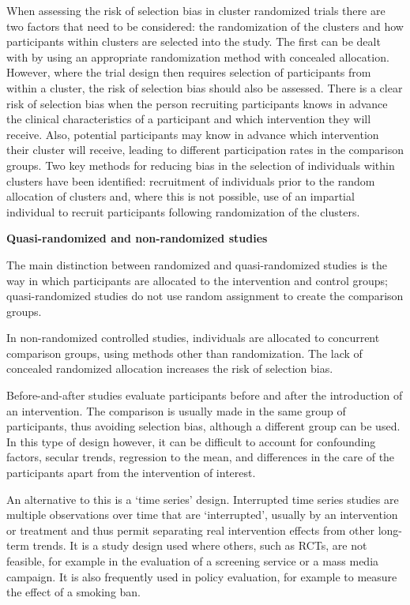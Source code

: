\documentclass[
  11pt,
  a4paper,
  DIV=11,
  numbers=noendperiod]{scrreprt}
\begin{document}
When assessing the risk of selection bias in cluster randomized trials
there are two factors that need to be considered: the randomization of
the clusters and how participants within clusters are selected into the
study. The first can be dealt with by using an appropriate randomization
method with concealed allocation. However, where the trial design then
requires selection of participants from within a cluster, the risk of
selection bias should also be assessed. There is a clear risk of
selection bias when the person recruiting participants knows in advance
the clinical characteristics of a participant and which intervention
they will receive. Also, potential participants may know in advance
which intervention their cluster will receive, leading to different
participation rates in the comparison groups. Two key methods for
reducing bias in the selection of individuals within clusters have been
identified: recruitment of individuals prior to the random allocation of
clusters and, where this is not possible, use of an impartial individual
to recruit participants following randomization of the clusters.

\textbf{Quasi-randomized and non-randomized studies}

The main distinction between randomized and quasi-randomized studies is
the way in which participants are allocated to the intervention and
control groups; quasi-randomized studies do not use random assignment to
create the comparison groups.

In non-randomized controlled studies, individuals are allocated to
concurrent comparison groups, using methods other than randomization.
The lack of concealed randomized allocation increases the risk of
selection bias.

Before-and-after studies evaluate participants before and after the
introduction of an intervention. The comparison is usually made in the
same group of participants, thus avoiding selection bias, although a
different group can be used. In this type of design however, it can be
difficult to account for confounding factors, secular trends, regression
to the mean, and differences in the care of the participants apart from
the intervention of interest.

An alternative to this is a `time series' design. Interrupted time
series studies are multiple observations over time that are
`interrupted', usually by an intervention or treatment and thus permit
separating real intervention effects from other long-term trends. It is
a study design used where others, such as RCTs, are not feasible, for
example in the evaluation of a screening service or a mass media
campaign. It is also frequently used in policy evaluation, for example
to measure the effect of a smoking ban.
\end{document}
